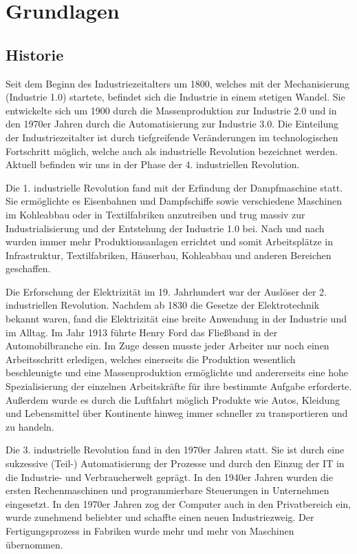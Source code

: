 \chapter{Grundlagen}
\section{Historie}
Seit dem Beginn des Industriezeitalters um 1800, welches mit der Mechanisierung (Industrie 1.0) startete, befindet sich die Industrie in einem stetigen Wandel. Sie entwickelte sich um 1900 durch die Massenproduktion zur Industrie 2.0 und in den 1970er Jahren durch die Automatisierung zur Industrie 3.0. Die Einteilung der Industriezeitalter ist durch tiefgreifende Veränderungen im technologischen Fortschritt möglich, welche auch als industrielle Revolution bezeichnet werden. Aktuell befinden wir uns in der Phase der 4. industriellen Revolution.

Die 1. industrielle Revolution fand mit der Erfindung der Dampfmaschine statt. Sie ermöglichte es Eisenbahnen und Dampfschiffe sowie verschiedene Maschinen im Kohleabbau oder in Textilfabriken anzutreiben und trug massiv zur Industrialisierung und der Entstehung der Industrie 1.0 bei. Nach und nach wurden immer mehr Produktionsanlagen errichtet und somit Arbeitsplätze in Infrastruktur, Textilfabriken, Häuserbau, Kohleabbau und anderen Bereichen geschaffen.

Die Erforschung der Elektrizität im 19. Jahrhundert war der Auslöser der 2. industriellen Revolution. Nachdem ab 1830 die Gesetze der Elektrotechnik bekannt waren, fand die Elektrizität eine breite Anwendung in der Industrie und im Alltag. Im Jahr 1913 führte Henry Ford das Fließband in der Automobilbranche ein. Im Zuge dessen musste jeder Arbeiter nur noch einen Arbeitsschritt erledigen, welches einerseits die Produktion wesentlich beschleunigte und eine Massenproduktion ermöglichte und andererseits eine hohe Spezialisierung der einzelnen Arbeitskräfte für ihre bestimmte Aufgabe erforderte. Außerdem wurde es durch die Luftfahrt möglich Produkte wie Autos, Kleidung und Lebensmittel über Kontinente hinweg immer schneller zu transportieren und zu handeln.

Die 3. industrielle Revolution fand in den 1970er Jahren statt. Sie ist durch eine sukzessive (Teil-) Automatisierung der Prozesse und durch den Einzug der IT in die Industrie- und Verbraucherwelt geprägt. In den 1940er Jahren wurden die ersten Rechenmaschinen und programmierbare Steuerungen in Unternehmen eingesetzt. In den 1970er Jahren zog der Computer auch in den Privatbereich ein, wurde zunehmend beliebter und schaffte einen neuen Industriezweig. Der Fertigungsprozess in Fabriken wurde mehr und mehr von Maschinen übernommen.

